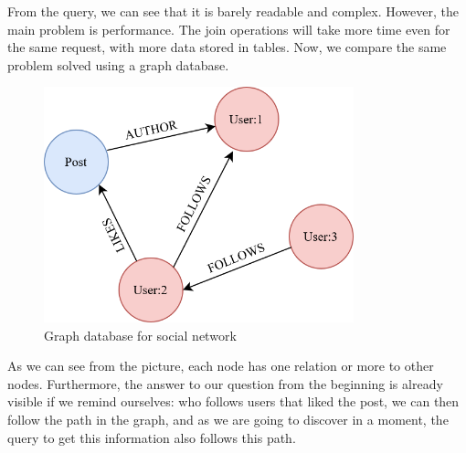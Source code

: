 
From the query, we can see that it is barely readable and complex. However, the main problem is performance. The join operations will take more time even for the same request, with more data stored in tables.
Now, we compare the same problem solved using a graph database.

\begin{figure}[H]
    \centering
    \includegraphics[width=0.8\textwidth]{content/graph_example.png}
    \caption{Graph database for social network}
\end{figure}

As we can see from the picture, each node has one relation or more to other nodes. Furthermore,
the answer to our question from the beginning is already visible if we remind ourselves:
who follows users that liked the post, we can then follow the path in the graph, and as we are going to discover in a moment,
the query to get this information also follows this path.

